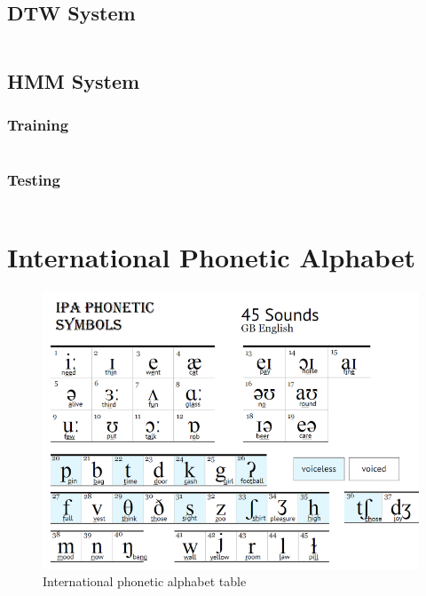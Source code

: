 \documentclass[12pt, a4paper, twoside]{report}
\begin{document}
\begin{appendices}
\section{DTW System}
\inputminted[linenos, numbersep=5pt, frame=single, breaklines=true, tabsize=2]
{Matlab}{codes/dtw.m}

\section{HMM System}
\subsection{Training}
\inputminted[linenos, numbersep=5pt, frame=single, breaklines=true, tabsize=2]
{Python}{codes/hmm-train.py}
\subsection{Testing}
\inputminted[linenos, numbersep=5pt, frame=single, breaklines=true, tabsize=2]
{Python}{codes/hmm-test.py}

\chapter{International Phonetic Alphabet}
\begin{figure}[!h]
	\centering
	\includegraphics[width=1\textwidth]
	{images/appendix-b/ipa}
	\caption{International phonetic alphabet table}
	\label{fig:hardware-6}
\end{figure}

\end{appendices}
\end{document}
